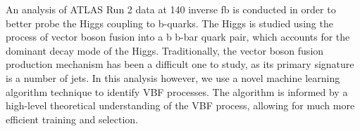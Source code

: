 \documentclass[paper=a4,fontsize=12pt]{article}
\begin{document}
An analysis of ATLAS Run 2 data at 140 inverse fb is conducted in order to better probe the Higgs coupling to b-quarks. The Higgs is studied using the process of vector boson fusion into a b b-bar quark pair, which accounts for the dominant decay mode of the Higgs. Traditionally, the vector boson fusion production mechanism has been a difficult one to study, as its primary signature is a number of jets. In this analysis however, we use a novel machine learning algorithm technique to identify VBF processes. The algorithm is informed by a high-level theoretical understanding of the VBF process, allowing for much more efficient training and selection.
\end{document}
